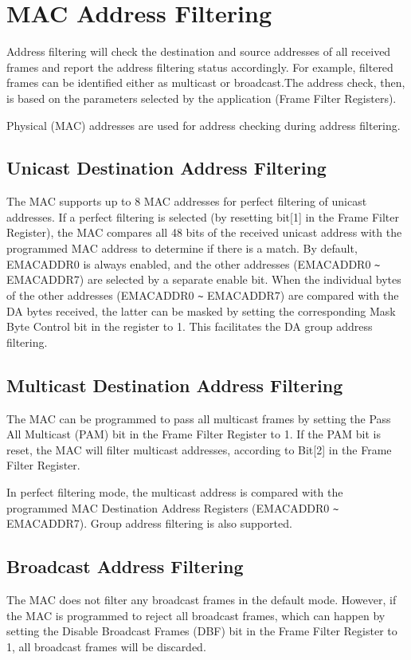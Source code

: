 \documentclass[main\_\_EN.tex]{subfiles}
\begin{document}
\section{MAC Address Filtering}

Address filtering will check the destination and source addresses of all received frames and report the address filtering status accordingly. For example, filtered frames can be identified either as multicast or broadcast.The address check, then, is based on the parameters selected by the application (Frame Filter Registers).

Physical (MAC) addresses are used for address checking during address filtering.

\subsection{Unicast Destination Address Filtering}
The MAC supports up to 8 MAC addresses for perfect filtering of unicast addresses. If a perfect filtering is selected (by resetting bit[1] in the Frame Filter Register), the MAC compares all 48 bits of the received unicast address with the programmed MAC address to determine if there is a match. By default, EMACADDR0 is always enabled, and the other addresses (EMACADDR0 \verb+~+ EMACADDR7) are selected by a separate enable bit. When the individual bytes of the other addresses (EMACADDR0 \verb+~+ EMACADDR7) are compared with the DA bytes received, the latter can be masked by setting the corresponding Mask Byte Control bit in the register to 1. This facilitates the DA group address filtering.

\subsection{Multicast Destination Address Filtering}
The MAC can be programmed to pass all multicast frames by setting the Pass All Multicast (PAM) bit in the Frame Filter Register to 1. If the PAM bit is reset, the MAC will filter multicast addresses, according to Bit[2] in the Frame Filter Register.

In perfect filtering mode, the multicast address is compared with the programmed MAC Destination Address Registers (EMACADDR0 \verb+~+ EMACADDR7). Group address filtering is also supported.

\subsection{Broadcast Address Filtering }
The MAC does not filter any broadcast frames in the default mode. However, if the MAC is programmed to reject all broadcast frames, which can happen by setting the Disable Broadcast Frames (DBF) bit in the Frame Filter Register to 1, all broadcast frames will be discarded.
\end{document}
